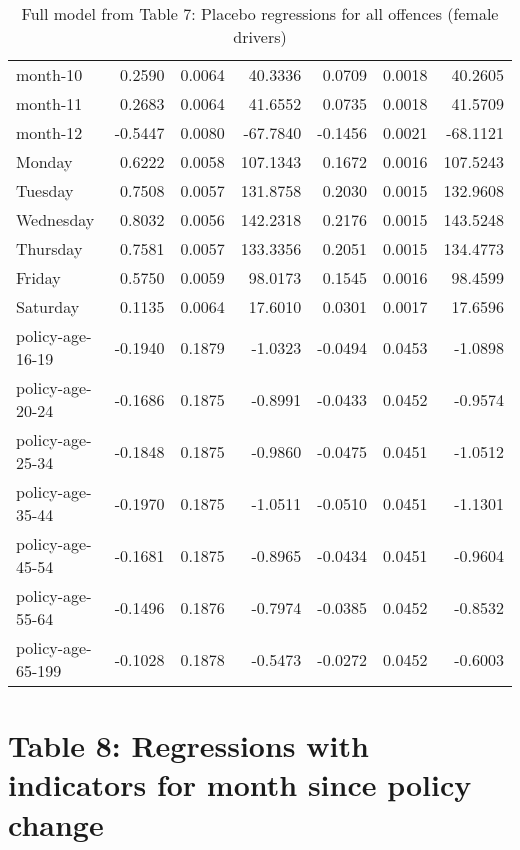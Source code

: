 \documentclass[10pt]{article}
\begin{document}
\begin{table}[ht]
\begin{tabular}{lrrrrrr}
  month-10 & 0.2590 & 0.0064 & 40.3336 & 0.0709 & 0.0018 & 40.2605 \\ 
  month-11 & 0.2683 & 0.0064 & 41.6552 & 0.0735 & 0.0018 & 41.5709 \\ 
  month-12 & -0.5447 & 0.0080 & -67.7840 & -0.1456 & 0.0021 & -68.1121 \\ 
  Monday & 0.6222 & 0.0058 & 107.1343 & 0.1672 & 0.0016 & 107.5243 \\ 
  Tuesday & 0.7508 & 0.0057 & 131.8758 & 0.2030 & 0.0015 & 132.9608 \\ 
  Wednesday & 0.8032 & 0.0056 & 142.2318 & 0.2176 & 0.0015 & 143.5248 \\ 
  Thursday & 0.7581 & 0.0057 & 133.3356 & 0.2051 & 0.0015 & 134.4773 \\ 
  Friday & 0.5750 & 0.0059 & 98.0173 & 0.1545 & 0.0016 & 98.4599 \\ 
  Saturday & 0.1135 & 0.0064 & 17.6010 & 0.0301 & 0.0017 & 17.6596 \\ 
  policy-age-16-19 & -0.1940 & 0.1879 & -1.0323 & -0.0494 & 0.0453 & -1.0898 \\ 
  policy-age-20-24 & -0.1686 & 0.1875 & -0.8991 & -0.0433 & 0.0452 & -0.9574 \\ 
  policy-age-25-34 & -0.1848 & 0.1875 & -0.9860 & -0.0475 & 0.0451 & -1.0512 \\ 
  policy-age-35-44 & -0.1970 & 0.1875 & -1.0511 & -0.0510 & 0.0451 & -1.1301 \\ 
  policy-age-45-54 & -0.1681 & 0.1875 & -0.8965 & -0.0434 & 0.0451 & -0.9604 \\ 
  policy-age-55-64 & -0.1496 & 0.1876 & -0.7974 & -0.0385 & 0.0452 & -0.8532 \\ 
  policy-age-65-199 & -0.1028 & 0.1878 & -0.5473 & -0.0272 & 0.0452 & -0.6003 \\ 
   \hline
\end{tabular}
\caption{Full model from Table 7: Placebo regressions for all offences (female drivers)} 
\label{tab_7_all_pts_F}
\end{table}


\clearpage
\pagebreak




\section{Table 8: Regressions with indicators for month since policy change}
\end{document}

